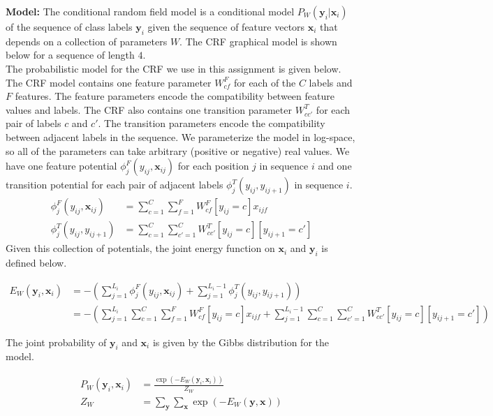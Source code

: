 \documentclass[11pt]{article}
\newcommand{\mbf}[1]{{\mathbf{#1}}}
\begin{document}
\textbf{Model:} The conditional random field model is a conditional model $P_W(\mbf{y}_i|\mbf{x}_i)$ of the sequence of class labels $\mbf{y}_i$ given the sequence of feature vectors $\mbf{x}_i$ that depends on a collection of parameters $W$. The CRF graphical
model is shown below for a sequence of length $4$.\\


The probabilistic model for the CRF we use in this assignment is given below. The CRF model contains one feature parameter $W^F_{cf}$ for each of the $C$ labels and $F$ features. The feature parameters encode the compatibility between feature values and labels. The CRF also contains one transition parameter $W^T_{cc'}$ for each pair of labels $c$ and $c'$.  The transition parameters encode the compatibility between adjacent labels in the sequence. We parameterize the model in log-space, so all of the parameters can take arbitrary (positive or negative) real values. We have one feature potential
$\phi^F_j(y_{ij},\mbf{x}_{ij})$ for each position $j$ in sequence $i$ and one transition potential for each pair of adjacent labels $\phi^T_j(y_{ij},y_{ij+1})$ in sequence $i$.
%
\begin{align*}
\phi^F_j(y_{ij},\mbf{x}_{ij}) &= \sum_{c=1}^{C}\sum_{f=1}^F W^F_{cf}[y_{ij}=c]x_{ijf} \\
\phi^T_j(y_{ij},y_{ij+1}) &= \sum_{c=1}^{C}\sum_{c'=1}^{C}W^T_{cc'}[y_{ij}=c][y_{ij+1}=c']
\end{align*}
%
Given this collection of potentials, the joint energy function on $\mbf{x}_i$ and $\mbf{y}_i$ is defined below.

\begin{align*}
	E_{W}(\mbf{y}_i, \mbf{x}_i) &= -\left(\sum_{j=1}^{L_i}\phi^F_j(y_{ij},\mbf{x}_{ij})
	     +\sum_{j=1}^{L_i-1}\phi^T_j(y_{ij},y_{ij+1})     \right)\\
	&=-\left(\sum_{j=1}^{L_i}\sum_{c=1}^{C}\sum_{f=1}^F W^F_{cf}[y_{ij}=c]x_{ijf}
	     +\sum_{j=1}^{L_i-1}\sum_{c=1}^{C}\sum_{c'=1}^{C}W^T_{cc'}[y_{ij}=c][y_{ij+1}=c']\right)
\end{align*}

The joint probability of $\mbf{y}_i$ and  $\mbf{x}_i$ is given by the Gibbs distribution for the model.

\begin{align*}
	P_{W}(\mbf{y}_i, \mbf{x}_i) &= \frac{\exp(-E_{W}(\mbf{y}_i, \mbf{x}_i))}{Z_W}\\
	Z_W & = \sum_{\mbf{y}}\sum_{\mbf{x}} \exp(-E_{W}(\mbf{y}, \mbf{x}))
\end{align*}
\end{document}
